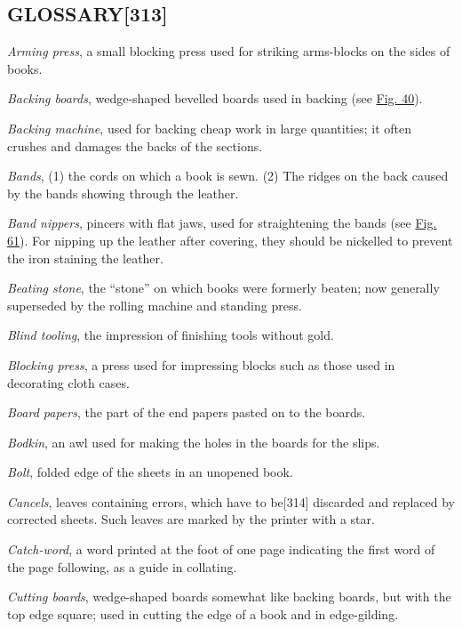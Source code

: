 \documentclass[
]{article}
\begin{document}
\hypertarget{glossary313}{%
\subsection[GLOSSARY]{\texorpdfstring{\protect\hypertarget{GLOSSARY}{}{}GLOSSARY{\protect\hypertarget{Page_313}{}{{[}313{]}}}}{GLOSSARY{[}313{]}}}\label{glossary313}}

\emph{Arming press}, a small blocking press used for striking
arms-blocks on the sides of books.

\emph{Backing boards}, wedge-shaped bevelled boards used in backing (see
\protect\hyperlink{Fig_40}{Fig. 40}).

\emph{Backing machine}, used for backing cheap work in large quantities;
it often crushes and damages the backs of the sections.

\emph{Bands}, (1) the cords on which a book is sewn. (2) The ridges on
the back caused by the bands showing through the leather.

\emph{Band nippers}, pincers with flat jaws, used for straightening the
bands (see \protect\hyperlink{Fig_61}{Fig. 61}). For nipping up the
leather after covering, they should be nickelled to prevent the iron
staining the leather.

\emph{Beating stone}, the ``stone'' on which books were formerly beaten;
now generally superseded by the rolling machine and standing press.

\emph{Blind tooling}, the impression of finishing tools without gold.

\emph{Blocking press}, a press used for impressing blocks such as those
used in decorating cloth cases.

\emph{Board papers}, the part of the end papers pasted on to the boards.

\emph{Bodkin}, an awl used for making the holes in the boards for the
slips.

\emph{Bolt}, folded edge of the sheets in an unopened book.

\emph{Cancels}, leaves containing errors, which have to
be{\protect\hypertarget{Page_314}{}{{[}314{]}}} discarded and replaced
by corrected sheets. Such leaves are marked by the printer with a star.

\emph{Catch-word}, a word printed at the foot of one page indicating the
first word of the page following, as a guide in collating.

\emph{Cutting boards}, wedge-shaped boards somewhat like backing boards,
but with the top edge square; used in cutting the edge of a book and in
edge-gilding.
\end{document}
